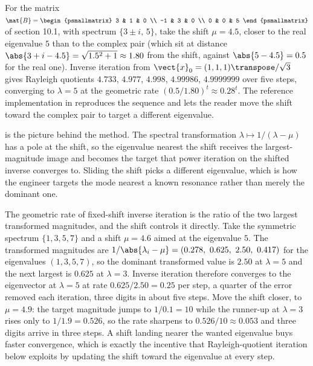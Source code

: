 \begin{example}
For the matrix $\mat{B} = \begin{psmallmatrix} 3 & 1 & 0 \\ -1 & 3 & 0
\\ 0 & 0 & 5 \end{psmallmatrix}$ of section 10.1, with spectrum
$\{3 \pm i,\, 5\}$, take the shift $\mu = 4.5$, closer to the real
eigenvalue $5$ than to the complex pair (which sit at distance
$\abs{3 + i - 4.5} = \sqrt{1.5^{2} + 1} \approx 1.80$ from the shift,
against $\abs{5 - 4.5} = 0.5$ for the real one). Inverse iteration
from $\vect{x}_{0} = (1, 1, 1)\transpose/\sqrt{3}$ gives Rayleigh
quotients $4.733$, $4.977$, $4.998$, $4.99986$, $4.9999999$ over five
steps, converging to $\lambda = 5$ at the geometric rate
$(0.5/1.80)^{t} \approx 0.28^{t}$. The reference implementation in
 reproduces the sequence and lets
the reader move the shift toward the complex pair to target a
different eigenvalue.
\end{example}



 is the picture behind
the method. The spectral transformation $\lambda \mapsto 1/(\lambda -
\mu)$ has a pole at the shift, so the eigenvalue nearest the shift
receives the largest-magnitude image and becomes the target that power
iteration on the shifted inverse converges to. Sliding the shift picks
a different eigenvalue, which is how the engineer targets the mode
nearest a known resonance rather than merely the dominant one.

\begin{example}
The geometric rate of fixed-shift inverse iteration is the ratio of
the two largest transformed magnitudes, and the shift controls it
directly. Take the symmetric spectrum $\{1, 3, 5, 7\}$ and a shift
$\mu = 4.6$ aimed at the eigenvalue $5$. The transformed magnitudes are
$1/\abs{\lambda_i - \mu} = (0.278,\ 0.625,\ 2.50,\ 0.417)$ for the
eigenvalues $(1, 3, 5, 7)$, so the dominant transformed value is
$2.50$ at $\lambda = 5$ and the next largest is $0.625$ at $\lambda =
3$. Inverse iteration therefore converges to the eigenvector at
$\lambda = 5$ at rate $0.625/2.50 = 0.25$ per step, a quarter of the
error removed each iteration, three digits in about five steps. Move
the shift closer, to $\mu = 4.9$: the target magnitude jumps to
$1/0.1 = 10$ while the runner-up at $\lambda = 3$ rises only to
$1/1.9 = 0.526$, so the rate sharpens to $0.526/10 \approx 0.053$ and
three digits arrive in three steps. A shift landing nearer the wanted
eigenvalue buys faster convergence, which is exactly the incentive
that Rayleigh-quotient iteration below exploits by updating the shift
toward the eigenvalue at every step.
\end{example}

